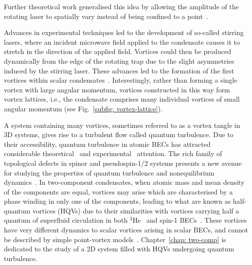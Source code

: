 Further theoretical work generalised this idea by allowing the amplitude of the
rotating laser to spatially vary instead of being confined to a
point~\cite{Ruostekoski2000}.

Advances in experimental techniques led to the development of so-called stirring
lasers, where an incident microwave field applied to the condensate causes
it to stretch in the direction of the applied field.
Vortices could then be produced dynamically from the edge of the rotating trap
due to the slight asymmetries induced by the stirring laser.
These advances led to the formation of the first vortices within scalar
condensates~\cite{Madison2000, Madison2000a, Abo-Shaeer2001}.
Interestingly, rather than forming a single vortex with large angular momentum,
vortices constructed in this way form vortex lattices, i.e., the condensate
comprises many individual vortices of small angular momentum (see
Fig.~\ref{subfig: vortex-lattice}).

A system containing many vortices, sometimes referred to as a vortex tangle
in 3D systems, gives rise to a turbulent flow called quantum turbulence.
Due to their accessibility, quantum turbulence in atomic BECs has attracted
considerable theoretical~\cite{Kobayashi2007,Numasato2010, Reeves2013,
Billam2014,Simula2014,Baggaley2018} and experimental~\cite{Henn2009,Kwon2014,
Seo2017,Navon2019,Gauthier2019,Johnstone2019} attention.
The rich family of topological defects in spinor and pseudospin-1/2
systems presents a new avenue for studying the properties of quantum turbulence
and nonequilibrium dynamics~\cite{Salman2009, Schmied2019, Karl2013, Prufer2018,
Hofmann2014}.
In two-component condensates, when atomic mass and mean density of the
components are equal, vortices may arise which are characterised by a phase
winding in only one of the components, leading to what are known as half-quantum
vortices (HQVs) due to their similarities with vortices carrying half a quantum
of superfluid circulation in both \(^3\)He~\cite{Autti2016} and
spin-1 BECs~\cite{Leonhardt2000, Seo2015}.
These vortices have very different dynamics to scalar vortices arising in scalar
BECs, and cannot be described by simple point-vortex models~\cite{Eto2011,
Kasamatsu2016}.
Chapter~\ref{chap: two-comp} is dedicated to the study of a 2D system filled
with HQVs undergoing quantum turbulence.


